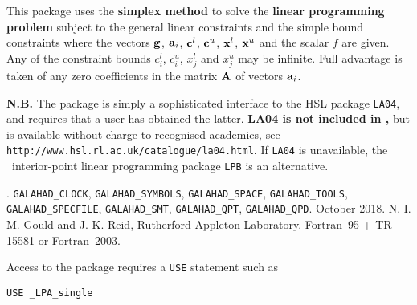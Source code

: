 \documentclass{galahad}
\newcommand{\packagename}{LPA}
\newcommand{\fullpackagename}{\libraryname\_\packagename}
\begin{document}
\galheader


\galsummary
This package uses the {\bf simplex method}
to solve the {\bf linear programming problem}
subject to the general linear constraints
and the simple bound constraints
where the vectors ${\mathbf{g}}$, ${\mathbf{a}}_{i}$, ${\mathbf{c}}^{l}$, ${\mathbf{c}}^{u}$, ${\mathbf{x}}^{l}$,
${\mathbf{x}}^{u}$ and the scalar $f$ are given.
Any of the constraint bounds $c_{i}^{l}$, $c_{i}^{u}$,
$x_{j}^{l}$ and $x_{j}^{u}$ may be infinite.
Full advantage is taken of any zero coefficients in
the matrix ${\mathbf{A}}$ of vectors ${\mathbf{a}}_{i}$.

\noindent
{\bf N.B.} The package is simply a sophisticated interface to the HSL package
  {\tt LA04}, and requires that a user has obtained the latter.
  {\bf {LA04} is not included in \galahad,}
  but is available without charge to recognised academics, see
  {\tt http://www.hsl.rl.ac.uk/catalogue/la04.html}. If {\tt LA04}
  is unavailable, the \galahad\ interior-point linear programming
  package {\tt LPB} is an alternative.


\galattributes
\galversions{\tt  \fullpackagename\_single, \fullpackagename\_double}.
\galuses
{\tt GALAHAD\_CLOCK},
{\tt GALAHAD\_SY\-M\-BOLS},
{\tt GALAHAD\-\_SPACE},
{\tt GALAHAD\_TOOLS},
{\tt GALAHAD\_SPECFILE},
{\tt GALAHAD\_SMT},
{\tt GALAHAD\_QPT},
{\tt GALAHAD\_\-QPD}.
\galdate October 2018.
\galorigin N. I. M. Gould and J. K. Reid, Rutherford Appleton Laboratory.
\gallanguage Fortran~95 + TR 15581 or Fortran~2003.


\galhowto


Access to the package requires a {\tt USE} statement such as

\medskip{}

\hspace{8mm} {\tt USE \fullpackagename\_single}
\end{document}
